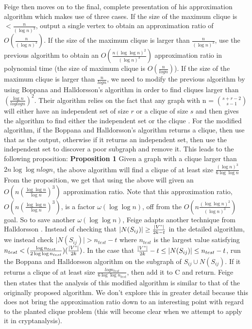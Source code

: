 \documentclass{article}
\theoremstyle{definition}
\begin{document}
Feige then moves on to the final, complete presentation of his approximation algorithm which makes use of three cases. If the size of the maximum clique is $ < \frac{n}{(\log n)^3}$, output a single vertex to obtain an approximation ratio of $O(\frac{n}{(\log n)^3})$. If the size of the maximum clique is larger than $\frac{n}{(\log n)^3}$, use the previous algorithm to obtain an $O(\frac{n(\log \log n)^2}{(\log n)^3})$ approximation ratio in polynomial time (the size of maximum clique is $O(\frac{n}{log n})$). If the size of the maximum clique is larger than $\frac{n}{log n}$, we need to modify the previous algorithm by using Boppana and Halldorsson's algorithm \cite{Boppana1992} in order to find cliques larger than $(\frac{\log n}{log log n})^2$. Their algorithm relies on the fact that any graph with n = $\binom{s + r - 2}{s - 1}$ will either have an independent set of size $r$ or a clique of size $s$ and then gives the algorithm to find either the independent set or the clique \cite{Boppana1992}. For the modified algorithm, if the Boppana and Halldorsson's algorithm returns a clique, then use that as the output, otherwise if it returns an independent set, then use the independent set to discover a poor subgraph and remove it. This leads to the following proposition: 
\newline\newline
\noindent \textbf{Proposition 1 } Given a graph with a clique larger than ${2n \log \log n}{log n}$, the above algorithm will find a clique of at least size $\frac{(\log n)^3}{6 \log \log n}$
\newline\newline
From the proposition, we get that using the above will given an $O(n(\frac{\log \log n}{\log n})^3)$ approximation ratio. Note that this approximation ratio, $O(n(\frac{\log \log n}{\log n})^3)$, is a factor $\omega(\log \log n)$, off from the $O(n\frac{(\log \log n)^2}{(\log n)^3})$ goal. So to save another $\omega(\log \log n)$, Feige adapts another technique from Halldorsson \cite{Hallorsson:1993}. Instead of checking that $\lvert N(S_{ij}) \rvert \geq \frac{\mid V"\mid }{2k - t}$ in the detailed algorithm, we instead check $\lvert N(S_{ij})\rvert  > n_{test} - t$ where $n_{test}$ is the largest value satisfying $n_{test} < (\frac{\log n_{test}}{2 \log \log n_{test}})(\frac{\mid V"\mid }{2k})$. In the case that $\frac{\mid V"\mid }{2k} - t \leq \lvert N(S_{ij})\rvert  \leq n_{test} - t$, run the Boppana and Halldorsson algorithm on the subgraph of $S_{ij} \cup N(S_{ij})$. If it returns a clique of at least size $\frac{log n_{test}}{6 \log \log n_{test}}$, then add it to C and return. Feige then states that the analysis of this modified algorithm is similar to that of the originally proposed algorithm.  We don't explore this in greater detail because this does not bring the approximation ratio down to an interesting point with regard to the planted clique problem 
(this will become clear when we attempt to apply it in cryptanalysis). 
\end{document}
